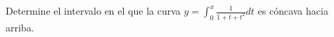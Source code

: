 \item Determine el intervalo en el que la curva $\displaystyle y = \int_0^x \frac{1}{1 + t + t^2} dt$ es cóncava hacia arriba.
